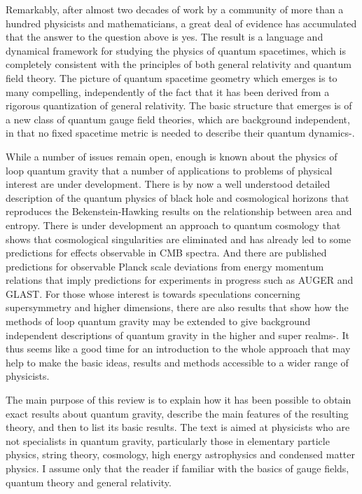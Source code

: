 \documentclass[12pt]{article}
\begin{document}
  Remarkably, after almost two decades of work by a community of more than a  hundred physicists and mathematicians, a great deal of evidence has 
  accumulated that the answer to the question above is yes.  
The result  is a language and
dynamical framework for studying the physics of quantum spacetimes, which is completely
consistent with the principles of both general relativity and quantum field theory.  
The picture of quantum spacetime geometry which emerges  is to many compelling, independently of the 
  fact that it has been derived from a rigorous quantization of 
  general relativity. The basic structure that emerges is of a new class of quantum
gauge field theories, which are background independent, in that no fixed spacetime metric 
is needed to describe their quantum dynamics\cite{abhaybooks}-\cite{alejandro-review}. 

While a number of  issues remain open, enough is known about the physics
of loop quantum gravity that a number of applications to problems of physical
interest are under development. There is by now a well understood detailed description of the
quantum physics of 
black hole and cosmological horizons\cite{linking,kirill1,isolated} 
that reproduces the Bekenstein-Hawking
results on the relationship between area and entropy\cite{bb}.  There is under 
development an approach to quantum cosmology that shows 
that cosmological singularities are eliminated\cite{LQC}
and has already 
led to some predictions for effects observable in CMB
spectra\cite{LQC,lqc-inflation}. And there are published predictions 
for observable Planck scale deviations from
energy momentum relations\cite{GP,AMU}  
that imply predictions for experiments in progress such as
AUGER and GLAST.  For those whose interest is 
towards  speculations
concerning supersymmetry and higher dimensions, 
there are also results that show how the methods of loop 
quantum gravity may be extended to give background 
independent descriptions of quantum gravity in the higher and super realms\cite{yime-holo}-\cite{Mlee}.  
It thus seems like a good time
for an introduction to the whole approach that may help to make the basic ideas, results
and methods accessible to
a wider range of physicists. 
 
The main purpose of 
  this review is to explain how it has been possible to obtain exact 
  results about quantum gravity, describe the main features of the resulting
theory, and then to 
  list its basic results.  The text is aimed at physicists who are not specialists in quantum gravity, particularly those in elementary particle physics, string theory,
cosmology, high energy astrophysics and  condensed matter physics.  
I assume only that the reader if familiar 
 with the basics of gauge fields, quantum theory and  general relativity.  
\end{document}
